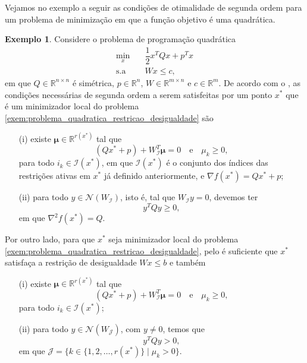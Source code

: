 \documentclass[12pt,a4paper]{scrartcl}
\def\RR{\mathds{R}}
\theoremstyle{definition}%
\newtheorem{exem}{Exemplo}
\begin{document}
Vejamos no exemplo a seguir as condições de otimalidade de segunda ordem para um problema de minimização em que a função objetivo é uma quadrática.

\begin{exem}
Considere o problema de programação quadrática
\[ \label{exem:problema_quadratica_restricao_desigualdade}
\begin{aligned}
\min_{x} & \quad \dfrac{1}{2} x^{T}Qx + p^{T}x \\
\text{s.a} & \quad Wx \leq c,
\end{aligned}
\]
em que $Q\in \RR^{n\times n}$ é simétrica, $p\in \RR^{n}$, $W\in \RR^{m\times n}$ e $c\in \RR^{m}$.
De acordo com o , as condições necessárias de segunda ordem a serem satisfeitas por um ponto $x^{*}$ que é um minimizador local do problema \eqref{exem:problema_quadratica_restricao_desigualdade} são
\begin{enumerate}
\item[(i)] existe $\boldsymbol{\mu} \in \RR^{r(x^{*})}$ tal que
\[
(Qx^{*} +p) + W_{\mathcal{I}}^{T} \boldsymbol{\mu} = 0 \quad \text{e} \quad \mu_{k} \geq 0,
\]
para todo $i_{k} \in \mathcal{I}(x^{*})$, em que $\mathcal{I}(x^{*})$ é o conjunto dos índices das restrições ativas em $x^{*}$ já definido anteriormente, e $\nabla f(x^{*}) = Qx^{*} +p$;

\item[(ii)] para todo $y\in \mathcal{N}(W_{\mathcal{I}})$, isto é, tal que $W_{\mathcal{I}} y=0$, devemos ter
\[
y^{T}Qy \geq 0,
\]
em que $\nabla^{2} f(x^{*}) =Q$.
\end{enumerate}

Por outro lado, para que $x^{*}$ seja minimizador local do problema \eqref{exem:problema_quadratica_restricao_desigualdade}, pelo  é suficiente que $x^{*}$ satisfaça a restrição de desigualdade $Wx \leq b$ e também
\begin{enumerate}
\item[(i)] existe $\boldsymbol{\mu} \in \RR^{r(x^{*})}$ tal que
\[
(Qx^{*} +p) + W_{\mathcal{I}}^{T} \boldsymbol{\mu} = 0 \quad \text{e} \quad \mu_{k} \geq 0,
\]
para todo $i_{k} \in \mathcal{I}(x^{*})$;

\item[(ii)] para todo $y\in \mathcal{N}(W_{\mathcal{J}})$, com $y\neq 0$, temos que
\[
y^{T}Qy >0,
\]
em que $\mathcal{J} = \{ k\in \{1,2, \ldots , r(x^{*}) \} \mid \mu_{k} >0 \}$.
\end{enumerate}	


\end{exem}
\end{document}
